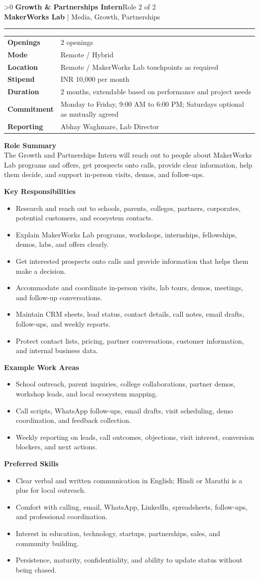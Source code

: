 \documentclass[10pt,a4paper]{article}
\newcommand{\CommonStipend}{INR 10,000 per month}
\newcommand{\CommonDuration}{2 months, extendable based on performance and project needs}
\newcommand{\CommonCommitment}{Monday to Friday, 9:00 AM to 6:00 PM; Saturdays optional as mutually agreed}
\newcommand{\CommonReporting}{Abhay Waghmare, Lab Director}
\newcounter{rolepage}
\newcommand{\RolePage}[3]{%
  \ifnum\value{rolepage}>0\clearpage\fi
  \stepcounter{rolepage}
  \thispagestyle{plain}
  {\Large\textbf{#1}}\hfill{\small #2}\\
  {\small\textbf{MakerWorks Lab} | Media, Growth, Partnerships}\\[4pt]
  \hrule
  \vspace{6pt}
  #3
}
\newcommand{\DetailsTable}[3]{%
\begin{tabularx}{\linewidth}{>{\bfseries}p{30mm}X}
Openings & #3 \\
Mode & #1 \\
Location & #2 \\
Stipend & \CommonStipend \\
Duration & \CommonDuration \\
Commitment & \CommonCommitment \\
Reporting & \CommonReporting \\
\end{tabularx}
}
\newcommand{\RoleSection}[1]{\vspace{5pt}\par\noindent\textbf{#1}\par\vspace{2pt}}
\begin{document}
\RolePage{Growth \& Partnerships Intern}{Role 2 of 2}{
\DetailsTable{Remote / Hybrid}{Remote / MakerWorks Lab touchpoints as required}{2 openings}

\textbf{Role Summary}\\
The Growth and Partnerships Intern will reach out to people about MakerWorks Lab programs and offers, get prospects onto calls, provide clear information, help them decide, and support in-person visits, demos, and follow-ups.

\RoleSection{Key Responsibilities}
\begin{itemize}
  \item Research and reach out to schools, parents, colleges, partners, corporates, potential customers, and ecosystem contacts.
  \item Explain MakerWorks Lab programs, workshops, internships, fellowships, demos, labs, and offers clearly.
  \item Get interested prospects onto calls and provide information that helps them make a decision.
  \item Accommodate and coordinate in-person visits, lab tours, demos, meetings, and follow-up conversations.
  \item Maintain CRM sheets, lead status, contact details, call notes, email drafts, follow-ups, and weekly reports.
  \item Protect contact lists, pricing, partner conversations, customer information, and internal business data.
\end{itemize}

\RoleSection{Example Work Areas}
\begin{itemize}
  \item School outreach, parent inquiries, college collaborations, partner demos, workshop leads, and local ecosystem mapping.
  \item Call scripts, WhatsApp follow-ups, email drafts, visit scheduling, demo coordination, and feedback collection.
  \item Weekly reporting on leads, call outcomes, objections, visit interest, conversion blockers, and next actions.
\end{itemize}

\RoleSection{Preferred Skills}
\begin{itemize}
  \item Clear verbal and written communication in English; Hindi or Marathi is a plus for local outreach.
  \item Comfort with calling, email, WhatsApp, LinkedIn, spreadsheets, follow-ups, and professional coordination.
  \item Interest in education, technology, startups, partnerships, sales, and community building.
  \item Persistence, maturity, confidentiality, and ability to update status without being chased.
\end{itemize}

}
\end{document}
